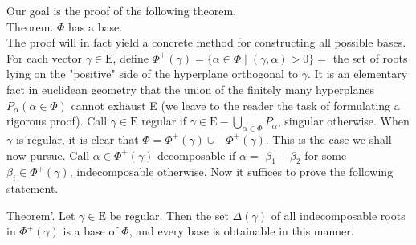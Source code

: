 \documentclass[10pt]{article}
\begin{document}
Our goal is the proof of the following theorem.\\
Theorem. $\Phi$ has a base.\\
The proof will in fact yield a concrete method for constructing all possible bases. For each vector $\gamma \in \mathrm{E}$, define $\Phi^{+}(\gamma)=\{\alpha \in \Phi \mid(\gamma, \alpha)>0\}=$ the set of roots lying on the "positive" side of the hyperplane orthogonal to $\gamma$. It is an elementary fact in euclidean geometry that the union of the finitely many hyperplanes $P_{\alpha}(\alpha \in \Phi)$ cannot exhaust E (we leave to the reader the task of formulating a rigorous proof). Call $\gamma \in \mathrm{E}$ regular if $\gamma \in \mathrm{E}-\bigcup_{\alpha \in \Phi} P_{\alpha}$, singular otherwise. When $\gamma$ is regular, it is clear that $\Phi=\Phi^{+}(\gamma) \cup-\Phi^{+}(\gamma)$. This is the case we shall now pursue. Call $\alpha \in \Phi^{+}(\gamma)$ decomposable if $\alpha=$ $\beta_{1}+\beta_{2}$ for some $\beta_{i} \in \Phi^{+}(\gamma)$, indecomposable otherwise. Now it suffices to prove the following statement.

Theorem'. Let $\gamma \in \mathrm{E}$ be regular. Then the set $\Delta(\gamma)$ of all indecomposable roots in $\Phi^{+}(\gamma)$ is a base of $\Phi$, and every base is obtainable in this manner.
\end{document}
